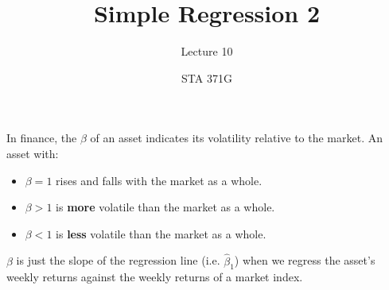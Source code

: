 \documentclass{beamer}\usepackage[]{graphicx}\usepackage[]{color}
\title{Simple Regression 2}
\subtitle{Lecture 10}
\author{STA 371G}
\makeatletter
\newcommand{\hlstr}[1]{\textcolor[rgb]{1,0.894,0.71}{#1}}%
\newcommand{\hlopt}[1]{\textcolor[rgb]{1,0.894,0.769}{#1}}%
\newcommand{\hlstd}[1]{\textcolor[rgb]{1,0.894,0.769}{#1}}%
\newcommand{\hlkwc}[1]{\textcolor[rgb]{0.78,0.941,0.545}{#1}}%
\newcommand{\hlkwd}[1]{\textcolor[rgb]{1,0.78,0.769}{#1}}%
\newenvironment{kframe}{%
 \def\at@end@of@kframe{}%
 \ifinner\ifhmode%
  \def\at@end@of@kframe{\end{minipage}}%
  \begin{minipage}{\columnwidth}%
 \fi\fi%
 \def\FrameCommand##1{\hskip\@totalleftmargin \hskip-\fboxsep
 \colorbox{shadecolor}{##1}\hskip-\fboxsep
     \hskip-\linewidth \hskip-\@totalleftmargin \hskip\columnwidth}%
 \MakeFramed {\advance\hsize-\width
   \@totalleftmargin\z@ \linewidth\hsize
   \@setminipage}}%
 {\par\unskip\endMakeFramed%
 \at@end@of@kframe}
\newenvironment{knitrout}{}{} %
\makeatother
\begin{document}
  
  
  

  \frame{\maketitle}



  \begin{darkframes}
    \begin{frame}
      In finance, the $\beta$ of an asset indicates its volatility relative to the market. An asset with:
      \pause
      \begin{itemize}[<+->]
        \item $\beta=1$ rises and falls with the market as a whole.
        \item $\beta>1$ is \textbf{more} volatile than the market as a whole.
        \item $\beta<1$ is \textbf{less} volatile than the market as a whole.
      \end{itemize}
      \pause
      $\beta$ is just the slope of the regression line (i.e. $\hat\beta_1$) when we regress the asset's weekly returns against the weekly returns of a market index.
    \end{frame}



\end{darkframes}
\end{document}
